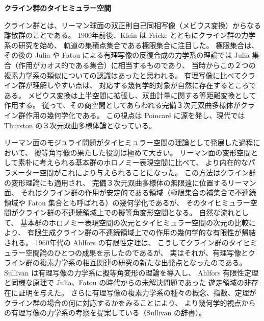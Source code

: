 \documentclass[uplatex,dvipdfmx]{jlreq}
\begin{document}
\newpage

\noindent
{\large\bfseries クライン群のタイヒミュラー空間}

\bigskip
\hspace*{\fill}{\large\bfseries 松崎　克彦（お茶の水女子大・理）}

\bigskip

クライン群とは、リーマン球面の双正則自己同相写像（メビウス変換）からなる離散群のことである。
1900年前後、Klein は Fricke とともにクライン群の力学系の研究を始め、
軌道の集積点集合である極限集合に注目した。
極限集合は、その後の Julia や Fatou による有理写像の反復合成の力学系の理論では
Julia 集合（作用がカオス的である集合）に相当するものであり、
当時からこの２つの複素力学系の類似についての認識はあったと思われる。
有理写像に比べてクライン群が理解しやすい点は、
対応する幾何学的対象が自然に存在するところである。
メビウス変換は上半空間に拡張し、双曲計量に関する等距離変換として作用する。
従って、その商空間としてあらわれる完備３次元双曲多様体がクライン群作用の幾何学化である。
この視点は Poincaré に源を発し、現代では Thurston の３次元双曲多様体論となっている。

リーマン面のモジュライ問題がタイヒミュラー空間の理論として発展した過程において、
擬等角写像の果たした役割は極めて大きい。
リーマン面の変形空間として素朴に考えられる基本群のホロノミー表現空間に比べて、
より内在的なパラメーター空間がこれにより与えられることになった。
この方法はクライン群の変形理論にも適用され、
完備３次元双曲多様体の無限遠に位置するリーマン面、
それはクライン群の作用が安定的である領域（極限集合の補集合で不連続領域や
Fatou 集合とも呼ばれる）の幾何学化であるが、
そのタイヒミュラー空間がクライン群の不連続領域上での擬等角変形空間となる。
自然な流れとして、
基本群のホロノミー表現空間の次元とタイヒミュラー空間の次元の比較により、
有限生成クライン群の不連続領域上での作用の幾何学的な有限性が帰結される。
1960年代の Ahlfors の有限性定理は、
こうしてクライン群のタイヒミュラー空間論のひとつの成果を示したのであるが、
実はそれが、有理写像とクライン群の複素力学系の相互関連の研究の新たな出発点となったのである。
Sullivan は有理写像の力学系に擬等角変形の理論を導入し、
Ahlfors 有限性定理と同様な原理で Julia、Fatou の時代からの未解決問題であった
遊走領域の非存在に証明を与えた。
さらに有理写像の複素力学系の種々の概念、指数、定理がクライン群の場合の何に対応するかをみることにより、
より幾何学的視点からの有理写像の力学系の考察を提案している（Sullivan の辞書）。
\end{document}

